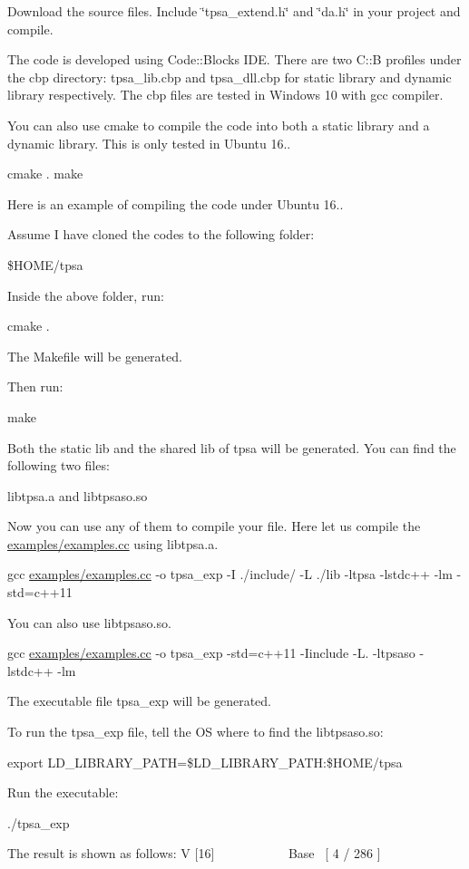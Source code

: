 \begin{DoxyItemize}
\item Download the source files. Include \char`\"{}tpsa\+\_\+extend.\+h\char`\"{} and \char`\"{}da.\+h\char`\"{} in your project and compile.
\item The code is developed using Code\+::\+Blocks I\+DE. There are two C\+::B profiles under the cbp directory\+: tpsa\+\_\+lib.\+cbp and tpsa\+\_\+dll.\+cbp for static library and dynamic library respectively. The cbp files are tested in Windows 10 with gcc compiler.
\item You can also use cmake to compile the code into both a static library and a dynamic library. This is only tested in Ubuntu 16..

{\ttfamily cmake .} {\ttfamily make}

Here is an example of compiling the code under Ubuntu 16..

Assume I have cloned the codes to the following folder\+:

\$\+H\+O\+ME/tpsa

Inside the above folder, run\+:

{\ttfamily cmake .}

The Makefile will be generated.

Then run\+:

{\ttfamily make}

Both the static lib and the shared lib of tpsa will be generated. You can find the following two files\+:

libtpsa.\+a and libtpsaso.\+so

Now you can use any of them to compile your file. Here let us compile the \mbox{\hyperlink{examples_8cc}{examples/examples.\+cc}} using libtpsa.\+a.

{\ttfamily gcc \mbox{\hyperlink{examples_8cc}{examples/examples.\+cc}} -\/o tpsa\+\_\+exp -\/I ./include/ -\/L ./lib -\/ltpsa -\/lstdc++ -\/lm -\/std=c++11}

You can also use libtpsaso.\+so.

{\ttfamily gcc \mbox{\hyperlink{examples_8cc}{examples/examples.\+cc}} -\/o tpsa\+\_\+exp -\/std=c++11 -\/Iinclude -\/L. -\/ltpsaso -\/lstdc++ -\/lm}

The executable file tpsa\+\_\+exp will be generated.

To run the tpsa\+\_\+exp file, tell the OS where to find the libtpsaso.\+so\+:

{\ttfamily export L\+D\+\_\+\+L\+I\+B\+R\+A\+R\+Y\+\_\+\+P\+A\+TH=\$\+L\+D\+\_\+\+L\+I\+B\+R\+A\+R\+Y\+\_\+\+P\+A\+TH\+:\$\+H\+O\+ME/tpsa}

Run the executable\+:

{\ttfamily ./tpsa\+\_\+exp}

The result is shown as follows\+: V \mbox{[}16\mbox{]}              Base  \mbox{[} 4 / 286 \mbox{]}
\end{DoxyItemize}





